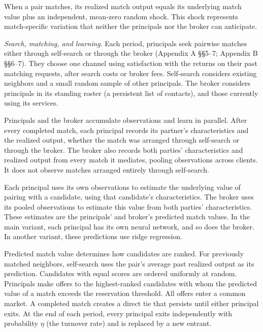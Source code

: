 When a pair matches, its realized match output equals its underlying match value plus an independent, mean-zero random shock. This shock represents match-specific variation that neither the principals nor the broker can anticipate.

\emph{Search, matching, and learning}. Each period, principals seek pairwise matches either through self-search or through the broker (Appendix A \S\S5--7; Appendix B \S\S6--7). They choose one channel using satisfaction with the returns on their past matching requests, after search costs or broker fees. Self-search considers existing neighbors and a small random sample of other principals. The broker considers principals in its standing roster (a persistent list of contacts), and those currently using its services.

Principals and the broker accumulate observations and learn in parallel. After every completed match, each principal records its partner's characteristics and the realized output, whether the match was arranged through self-search or through the broker. The broker also records both parties' characteristics and realized output from every match it mediates, pooling observations across clients. It does not observe matches arranged entirely through self-search.

Each principal uses its own observations to estimate the underlying value of pairing with a candidate, using that candidate's characteristics. The broker uses its pooled observations to estimate this value from both parties' characteristics. These estimates are the principals' and broker's predicted match values. In the main variant, each principal has its own neural network, and so does the broker. In another variant, these predictions use ridge regression.

Predicted match value determines how candidates are ranked. For previously matched neighbors, self-search uses the pair's average past realized output as its prediction. Candidates with equal scores are ordered uniformly at random. Principals make offers to the highest-ranked candidates with whom the predicted value of a match exceeds the reservation threshold. All offers enter a common market. A completed match creates a direct tie that persists until either principal exits. At the end of each period, every principal exits independently with probability $\eta$ (the turnover rate) and is replaced by a new entrant.

